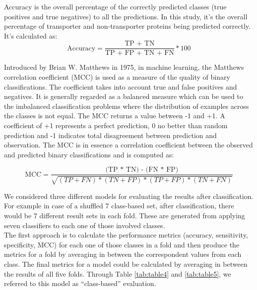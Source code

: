         Accuracy is the overall percentage of the correctly predicted classes (true positives and true negatives) to all the 
        predictions. In this study, it's the overall percentage of transporter and non-transporter proteins 
        being predicted correctly. It's calculated as:
        \begin{equation}
            \text{Accuracy} = \frac {\text{TP + TN}}{\text{TP + FP + TN + FN}} * 100
        \end{equation}

        Introduced by Brian W. Matthews in 1975, in machine learning, the Matthews correlation coefficient (MCC) 
        is used as a measure of the quality of binary classifications. The coefficient takes into account true 
        and false positives and negatives. It is generally regarded as a balanced measure which can be used to 
        the imbalanced classification problems where the distribution of examples across the classes is not equal.\cite{mcc2017optimal}
        The MCC returns a value between -1 and +1. A coefficient of +1 represents a perfect prediction, 0 no better than 
        random prediction and -1 indicates total disagreement between prediction and observation. The MCC is in 
        essence a correlation coefficient between the observed and predicted binary classifications and is computed as:
        
        \begin{equation}
            \text{MCC} = \frac {\text{(TP * TN) - (FN * FP)}}{\sqrt{(TP + FN) * (TN + FP) * (TP + FP) * (TN + FN)}}
        \end{equation}


        We considered three different models for evaluating the results after classification. For example in case of a 
        shuffled 7 class-based set, after classification, there would be 7 different result sets in each fold. 
        These are generated from applying seven classifiers to each one of those involved classes.\\ 

        The first approach is to calculate the performance metrics (accuracy, sensitivity, specificity, MCC) for 
        each one of those classes in a fold and then produce the metrics for a fold by averaging in between the 
        correspondent values from each class. The final metrics for a model could be calculated by averaging in 
        between the results of all five folds. Through Table \ref{tab:table4} and \ref{tab:table5}, 
        we referred to this model as “class-based” evaluation.\\


